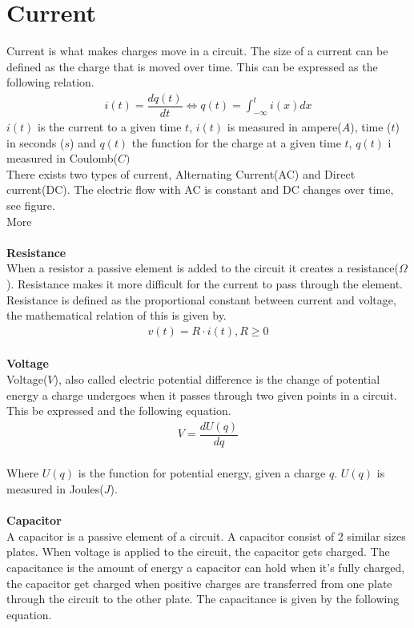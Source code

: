 \section{Current}
Current is what makes charges move in a circuit. The size of a current can be defined as the charge that is moved over time. This can be expressed as the following relation.
\begin{align}
i(t)=\dfrac{dq(t)}{dt} \Leftrightarrow q(t)=\int_{-\infty}^{t}i(x)dx
\end{align}
$i(t)$ is the current to a given time $t$, $i(t)$ is measured in ampere($A$), time ($t$) in seconds ($s$) and $q(t)$ the function for the charge at a given time $t$, $q(t)$ i measured in Coulomb($C)$
\\
There exists two types of current, Alternating Current(AC) and Direct current(DC). The electric flow with AC is constant and DC changes over time, see figure.
\\
More
\\
\\
\textbf{Resistance}
\\
When a resistor a passive element is added to the circuit it creates a resistance($\Omega$). Resistance makes it more difficult for the current to pass through the element. Resistance is defined as the proportional constant between current and voltage, the mathematical relation of this is given by.
\begin{align}
v(t)=R\cdot i(t),  R\geq0
\end{align}
\\
\textbf{Voltage}
\\
Voltage($V$), also called electric potential difference is the change of potential energy a charge undergoes when it passes through two given points in a circuit. This be expressed and the following equation.
\begin{align}
V=\dfrac{dU(q)}{dq}
\end{align}
\\
Where $U(q)$ is the function for potential energy, given a charge $q$. $U(q)$ is measured in Joules($J$).
\\
\\
\textbf{Capacitor}
\\
A capacitor is a passive element of a circuit. A capacitor consist of 2 similar sizes plates. When voltage is applied to the circuit, the capacitor gets charged. The capacitance is the amount of energy a capacitor can hold when it's fully charged, the capacitor get charged when positive charges are transferred from one plate through the circuit to the other plate. The capacitance is given by the following equation.
